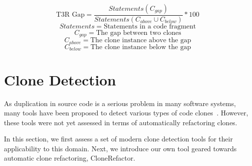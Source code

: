 \documentclass[a4paper]{article}
\begin{document}
\begin{equation}\label{eq:type3r}
\text{T3R Gap}=\frac{Statements(C_{gap})}{Statements(C_{above} \cup C_{below})}*100
\end{equation}
$$Statements = \text{Statements in a code fragment}$$
$$C_{gap} = \text{The gap between two clones}$$
$$C_{above} = \text{The clone instance above the gap}$$
$$C_{below} = \text{The clone instance below the gap}$$

\section{Clone Detection}\label{chap:clonedetection}
As duplication in source code is a serious problem in many software systems, many tools have been proposed to detect various types of code clones~\cite{sheneamer2016survey, svajlenko2014evaluating}. However, these tools were not yet assessed in terms of automatically refactoring clones.

In this section, we first assess a set of modern clone detection tools for their applicability to this domain. Next, we introduce our own tool geared towards automatic clone refactoring, CloneRefactor.%
\end{document}
